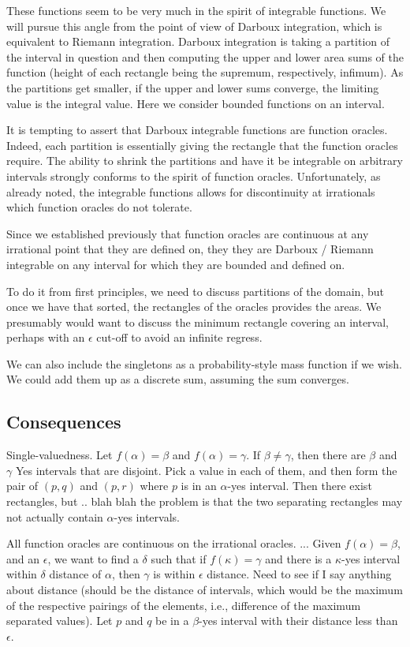 \documentclass[12pt]{article}
\theoremstyle{remark}
\begin{document}
These functions seem to be very much in the spirit of integrable functions. We will pursue this angle from the point of view of Darboux integration, which is equivalent to Riemann integration. Darboux integration is taking a partition of the interval in question and then computing the upper and lower area sums of the function (height of each rectangle being the supremum, respectively, infimum). As the partitions get smaller, if the upper and lower sums converge, the limiting value is the integral value. Here we consider bounded functions on an interval. 

It is tempting to assert that Darboux integrable functions are function oracles. Indeed, each partition is essentially giving the rectangle that the function oracles require. The ability to shrink the partitions and have it be integrable on arbitrary intervals strongly conforms to the spirit of function oracles. Unfortunately, as already noted, the integrable functions allows for discontinuity at irrationals which function oracles do not tolerate. 

Since we established previously that function oracles are continuous at any irrational point that they are defined on, they they are Darboux / Riemann integrable on any interval for which they are bounded and defined on. 

To do it from first principles, we need to discuss partitions of the domain, but once we have that sorted, the rectangles of the oracles provides the areas. We presumably would want to discuss the minimum rectangle covering an interval, perhaps with an $\epsilon$ cut-off to avoid an infinite regress. 

We can also include the singletons as a probability-style mass function if we wish. We could add them up as a discrete sum, assuming the sum converges. 

\subsection{Consequences}

Single-valuedness. Let $f(\alpha) = \beta$ and $f(\alpha) = \gamma$. If $\beta \neq \gamma$, then there are $\beta$ and $\gamma$ Yes intervals that are disjoint. Pick a value in each of them, and then form the pair of $(p, q)$ and $(p, r)$ where $p$ is in an $\alpha$-yes interval. Then there exist rectangles, but .. blah blah the problem is that the two separating rectangles may not actually contain $\alpha$-yes intervals. 


All function oracles are continuous on the irrational oracles. ... Given $f(\alpha) = \beta$, and an $\epsilon$, we want to find a $\delta$ such that if $f(\kappa) = \gamma$ and there is a $\kappa$-yes interval within $\delta$ distance of $\alpha$, then $\gamma$ is within $\epsilon$ distance. Need to see if I say anything about distance (should be the distance of intervals, which would be the maximum of the respective pairings of the elements, i.e., difference of the maximum separated values).  Let $p$ and $q$ be in a $\beta$-yes interval with their distance less than $\epsilon$. 
\end{document}
